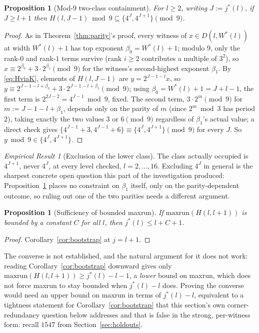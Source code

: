 \documentclass[11pt]{amsart}
\theoremstyle{plain}
\newtheorem{proposition}[theorem]{Proposition}
\theoremstyle{definition}
\theoremstyle{remark}
\newtheorem{empresult}[theorem]{Empirical Result}
\begin{document}
\begin{proposition}[Mod-$9$ two-class containment]
\label{prop:mod9}
For $l\ge2$, writing $J:=j^*(l)$, if $J\ge l+1$ then $H(l,J-1) \bmod 9 \subseteq \{4^J,
4^{J+1}\}\pmod9$.
\end{proposition}

\begin{proof}
As in Theorem~\ref{thm:parity}'s proof, every witness of $x\in D(l,W^*(l))$ at width $W^*(l)+1$ has
top exponent $\beta_0=W^*(l)+1$; modulo $9$, only the rank-$0$ and rank-$1$ terms survive (rank
$i\ge2$ contributes a multiple of $3^2$), so $x\equiv2^{\beta_0}+3\cdot2^{\beta_1}\pmod9$ for the
witness's second-highest exponent $\beta_1$. By \eqref{eq:HviaK}, elements of $H(l,J-1)$ are
$y=2^{J-1-l}x$, so $y\equiv2^{J-1-l+\beta_0}+3\cdot2^{J-1-l+\beta_1}\pmod9$; using
$\beta_0=W^*(l)+1=J+l-1$, the first term is $2^{2J-2}=4^{J-1}\bmod9$, fixed. The second term,
$3\cdot2^m\pmod9$ for $m:=J-1-l+\beta_1$, depends only on the parity of $m$ (since $2^m\bmod3$ has
period $2$), taking exactly the two values $3$ or $6\pmod9$ regardless of $\beta_1$'s actual value;
a direct check gives $\{4^{J-1}+3,4^{J-1}+6\}\equiv\{4^J,4^{J+1}\}\pmod9$ for every $J$. So
$y\bmod9\in\{4^J,4^{J+1}\}$.
\end{proof}

\begin{empresult}[Exclusion of the lower class]
\label{er:mod9}
The class actually occupied is $4^{J+1}$, never $4^J$, at every level checked, $l=2,\dots,16$.
Excluding $4^J$ in general is the
sharpest concrete open question this part of the investigation produced: Proposition~\ref{prop:mod9}
places no constraint on $\beta_1$ itself, only on the parity-dependent outcome, so ruling out one of
the two parities needs a different argument.
\end{empresult}

\begin{proposition}[Sufficiency of bounded maxrun]
\label{prop:h014}
If $\mathrm{maxrun}(H(l,l+1))$ is bounded by a constant $C$ for all $l$, then
$j^*(l) \le l + C + 1$.
\end{proposition}

\begin{proof}
Corollary~\ref{cor:bootstrap} at $j=l+1$.
\end{proof}

The converse is not established, and the natural argument for it does not work: reading
Corollary~\ref{cor:bootstrap} downward gives only $\mathrm{maxrun}(H(l,l+1)) \ge j^*(l)-l-1$, a
\emph{lower} bound on maxrun, which does not force maxrun to stay bounded when $j^*(l)-l$ does.
Proving the converse would need an upper bound on maxrun in terms of $j^*(l)-l$, equivalent to a
tightness statement for Corollary~\ref{cor:bootstrap} that this section's own corner-redundancy
question below addresses and that is false in the strong, per-witness form: recall
$1547$ from Section~\ref{sec:holdouts}.
\end{document}
